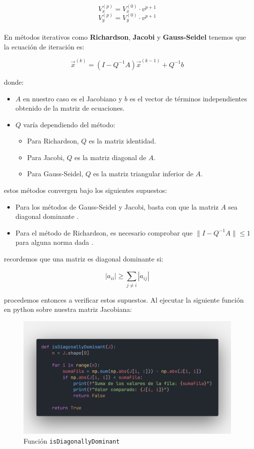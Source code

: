 \documentclass{article}
\begin{document}
  \[V_x^{(p)}=V_x^{(0)}\cdot v^{p+1}\]
  \[V_y^{(p)}=V_y^{(0)}\cdot v^{p+1}\]

  \paragraph{}
  En métodos iterativos como \textbf{Richardson}, \textbf{Jacobi} y \textbf{Gauss-Seidel} tenemos que la ecuación de iteración es:

  \[
  \vec{x}^{(k)}=(I-Q^{-1}A)\vec{x}^{(k-1)}+Q^{-1}b
  \]

  donde:
  \begin{itemize}
      \item $A$ en nuestro caso es el Jacobiano y $b$ es el vector de términos independientes obtenido de la matriz de ecuaciones.
      \item $Q$ varía dependiendo del método:
      \begin{itemize}
          \item Para Richardson, $Q$ es la matriz identidad.
          \item Para Jacobi, $Q$ es la matriz diagonal de $A$.
          \item Para Gauss-Seidel, $Q$ es la matriz triangular inferior de $A$.
      \end{itemize}
  \end{itemize}

  estos métodos convergen bajo los siguientes supuestos:
  \begin{itemize}
    \item Para los métodos de Gauss-Seidel y Jacobi, basta con que la matriz $A$ sea diagonal dominante \cite{kincaid2}.
    \item Para el método de Richardson, es necesario comprobar que $\|I-Q^{-1}A\| \leq 1$ para alguna norma dada \cite{kincaid2}.
  \end{itemize}

  recordemos que una matriz es diagonal dominante si:

  \[
  |a_{ii}| \geq \sum_{j \neq i}^{} |a_{ij}|
  \]

  procedemos entonces a verificar estos supuestos. Al ejecutar la siguiente función en python sobre nuestra matriz Jacobiana:

  \begin{figure}[H]
      \centering
      \includegraphics[width=1\textwidth]{DiagDom.png}
      \caption{Función \texttt{isDiagonallyDominant}}
  \end{figure}
\end{document}
